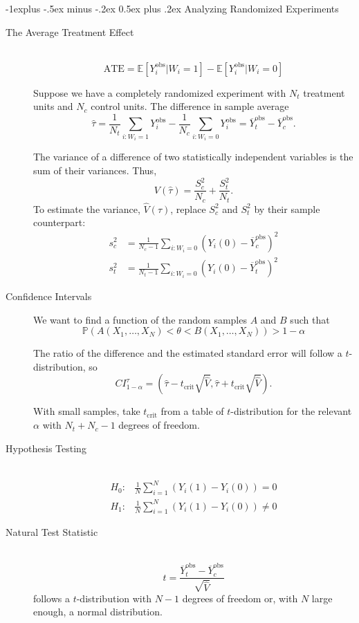 \documentclass[a4paper,10pt,landscape]{article}
\makeatletter
\renewcommand{\subsection}{\@startsection{subsection}{2}{0mm}%
                                {-1explus -.5ex minus -.2ex}%
                                {0.5ex plus .2ex}%
                                {\normalfont\normalsize\bfseries}}
\makeatother
\begin{document}
\begin{multicols*}{3}
\subsection{Analyzing Randomized Experiments}

\begin{description}
	\item[The Average Treatment Effect] ~
$$\text{ATE}=\mathbb{E}\left[Y_i^\text{obs}|W_i=1\right]-\mathbb{E}\left[Y_i^\text{obs}|W_i=0\right]$$
	\item[] Suppose we have a completely randomized experiment with $N_t$ treatment units and $N_c$ control units. The difference in sample average $$\hat{\tau}=\frac{1}{N_t}\sum_{i:W_i=1}Y_i^\text{obs}-\frac{1}{N_c}\sum_{i:W_i=0}Y_i^\text{obs}=\overline{Y}_t^\text{obs}-\overline{Y}_c^\text{obs}.$$
	\item[] The variance of a difference of two statistically independent variables is the sum of their variances. Thus,
	$$V\left(\hat{\tau}\right)=\frac{S_c^2}{N_c}+\frac{S_t^2}{N_t}.$$
	To estimate the variance, $\hat{V}\left(\hat{\tau}\right)$, replace $S_c^2$ and $S_t^2$ by their sample counterpart:
	\begin{align*}
		s_c^2&=\frac{1}{N_c-1}\sum_{i:W_i=0}\left(Y_i(0)-\overline{Y}_c^\text{obs}\right)^2\\
		s_t^2&=\frac{1}{N_t-1}\sum_{i:W_i=0}\left(Y_i(0)-\overline{Y}_t^\text{obs}\right)^2
	\end{align*}
	\item[Confidence Intervals] We want to find a function of the random samples $A$ and $B$ such that $$\mathbb{P}\left(A(X_1,\dots,X_N)<\theta<B(X_1,\dots,X_N)\right)>1-\alpha$$
	\item[] The ratio of the difference and the estimated standard error will follow a $t$-distribution, so
	$$CI_{1-\alpha}^{\tau}=\left(\hat{\tau}-t_\text{crit}\sqrt{\hat{V}},\hat{\tau}+t_\text{crit}\sqrt{\hat{V}}\right).$$
	\item[] With small samples, take $t_\text{crit}$ from a table of $t$-distribution for the relevant $\alpha$ with $N_t+N_c-1$ degrees of freedom.
	\item[Hypothesis Testing] ~
	\begin{align*}
		H_0: & \frac{1}{N}\sum_{i=1}^{N}\left(Y_i(1)-Y_i(0)\right)=0\\
		H_1: & \frac{1}{N}\sum_{i=1}^{N}\left(Y_i(1)-Y_i(0)\right)\neq0
	\end{align*}
	\item[Natural Test Statistic] ~
	$$t=\dfrac{\overline{Y}_t^\text{obs}-\overline{Y}_c^\text{obs}}{\sqrt{\hat{V}}}$$
	follows a $t$-distribution with $N-1$ degrees of freedom or, with $N$ large enough, a normal distribution.
\end{description}


\end{multicols*}
\end{document}
